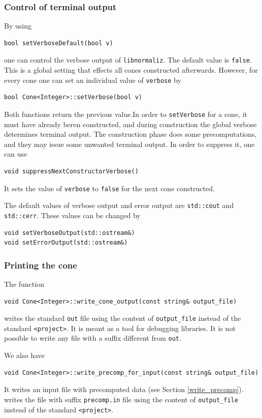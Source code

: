 \begin{small}
\subsubsection{Control of terminal output}
By using
\begin{Verbatim}
bool setVerboseDefault(bool v)
\end{Verbatim}
one can control the verbose output of \verb|libnormaliz|. The default value is \verb|false|. This is a global setting that effects all cones constructed afterwards. However, for every cone one can set an individual value of \verb|verbose| by
\begin{Verbatim}
bool Cone<Integer>::setVerbose(bool v)
\end{Verbatim}
Both functions return the previous value.In order to \verb|setVerbose| for a cone, it must have already beren constructed, and during construction the global verbose determines terminal output. The construction phase does some precomputations, and they may issue some unwanted terminal output. In order to suppress it, one can use
\begin{Verbatim}
void suppressNextConstructorVerbose()
\end{Verbatim}
It sets the value of \verb|verbose| to \verb|false| for the next cone constructed. 


The default values of verbose output and error output are \verb|std::cout| and \verb|std::cerr|. These values can be changed by
\begin{Verbatim}
void setVerboseOutput(std::ostream&)
void setErrorOutput(std::ostream&)
\end{Verbatim}

\subsubsection{Printing the cone}

The function
\begin{Verbatim}
void Cone<Integer>::write_cone_output(const string& output_file)
\end{Verbatim}
writes the standard \verb|out| file using the content of \verb|output_file| instead of the standard \verb|<project>|. It is meant as a tool for debugging libraries. It is not possible to write any file with a suffix different from \verb|out|.

We also have
\begin{Verbatim}
void Cone<Integer>::write_precomp_for_input(const string& output_file)
\end{Verbatim}
It writes an input file with precomputed data (see Section \ref{write_precomp}).
writes the file with suffix  \verb|precomp.in| file using the content of \verb|output_file| instead of the standard \verb|<project>|.


\end{small}
